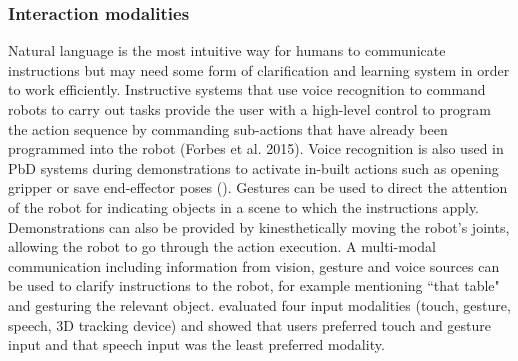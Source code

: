 \subsubsection{Interaction modalities}
Natural language is the most intuitive way for humans to communicate instructions but may need some form of clarification and learning system in order to work efficiently. 
Instructive systems that use voice recognition to command robots to carry out tasks provide the user with a high-level control to program the action sequence by commanding sub-actions that have already been programmed into the robot (Forbes et al. 2015).
Voice recognition is also used in PbD systems during demonstrations to activate in-built actions such as opening gripper or save end-effector poses (\cite{alexandrova2014robot}).
Gestures can be used to direct the attention of the robot for indicating objects in a scene to which the instructions apply.
Demonstrations can also be provided by kinesthetically moving the robot's joints, allowing the robot to go through the action execution.
A multi-modal communication including information from vision, gesture and voice sources can be used to clarify instructions to the robot, for example mentioning ``that table" and gesturing the relevant object.
\cite{profanter2015analysis} evaluated four input modalities (touch, gesture, speech, 3D tracking device) and showed that users preferred touch and gesture input and that speech input was the least preferred modality.




